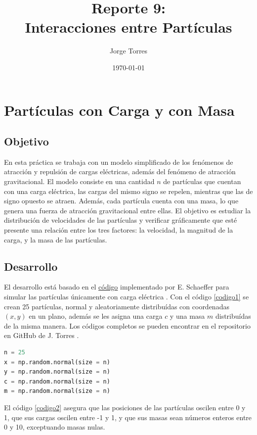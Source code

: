 \documentclass{report}
\title{Reporte 9:\\Interacciones entre Part\'iculas}
\author{Jorge Torres}
\date{\today}
\begin{document}
\maketitle

\chapter{Part\'iculas con Carga y con Masa}

\section{Objetivo}
En esta pr\'actica se trabaja con un modelo simplificado de los fen\'omenos de atracci\'on y repulsi\'on de cargas el\'ectricas, adem\'as del fen\'omeno de atracci\'on gravitacional. El modelo consiste en una cantidad $n$ de part\'iculas que cuentan con una carga el\'ectrica, las cargas del mismo signo se repelen, mientras que las de signo opuesto se atraen. Adem\'as, cada part\'icula cuenta con una masa, lo que genera una fuerza de atracci\'on gravitacional entre ellas. El objetivo es estudiar la distribución de velocidades de las partículas y verificar gráficamente que esté presente una relación entre los tres factores: la velocidad, la magnitud de la carga, y la masa de las partículas.

\section{Desarrollo}
El desarrollo est\'a basado en el \href{https://github.com/satuelisa/Simulation/blob/master/Particles/interaction.py}{c\'odigo} implementado por E. Schaeffer para simular las part\'iculas \'unicamente con carga el\'ectrica \cite{elisa1}. Con el c\'odigo \ref{codigo1} se crean 25 part\'iculas, normal y aleatoriamente distribu\'idas con coordenadas $(x, y)$ en un plano, adem\'as se les asigna una carga $c$ y una masa $m$ distribu\'idas de la misma manera. Los c\'odigos completos se pueden encontrar en el repositorio en GitHub de J. Torres \cite{jorge1}.

\begin{lstlisting}[caption=Creaci\'on de Part\'iculas, label=codigo1, language=Python]
n = 25
x = np.random.normal(size = n)
y = np.random.normal(size = n)
c = np.random.normal(size = n)
m = np.random.normal(size = n)
\end{lstlisting}

El c\'odigo \ref{codigo2} asegura que las posiciones de las part\'iculas oscilen entre 0 y 1, que sus cargas oscilen entre -1 y 1, y que sus masas sean n\'umeros enteros entre 0 y 10, exceptuando masas nulas.
\end{document}
